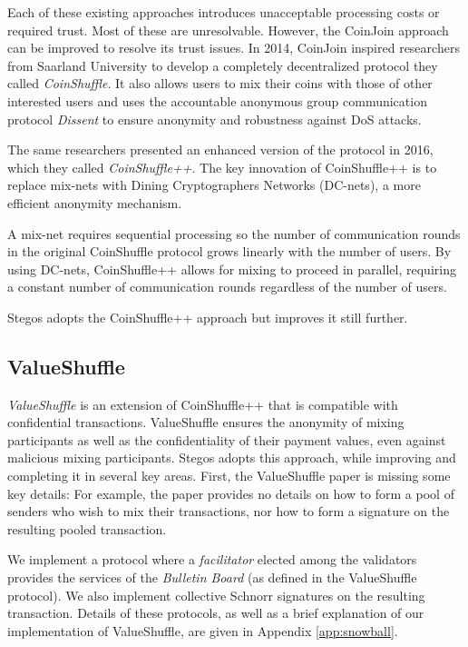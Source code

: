 \documentclass[8pt,fleqn,openany]{book}
\begin{document}
	Each of these existing approaches introduces unacceptable processing costs or required trust. Most of these are unresolvable. However, the CoinJoin approach can be improved to resolve its trust issues. In 2014, CoinJoin inspired researchers from Saarland University to develop a completely decentralized protocol they called \textit{CoinShuffle}\cite{c17}. It also allows users to mix their coins with those of other interested users and uses the accountable anonymous group communication protocol \textit{Dissent} to ensure anonymity and robustness against DoS attacks. 
	
	The same researchers presented an enhanced version of the protocol in 2016, which they called \textit{CoinShuffle++}\cite{c18}. The key innovation of CoinShuffle++ is to replace mix-nets with Dining Cryptographers Networks (DC-nets)\cite{c20}, a more efficient anonymity mechanism. 
	
	A mix-net requires sequential processing so the number of communication rounds in the original CoinShuffle protocol grows linearly with the number of users. By using DC-nets, CoinShuffle++ allows for mixing to proceed in parallel, requiring a constant number of communication rounds regardless of the number of users.
	
	Stegos adopts the CoinShuffle++ approach but improves it still further.
	
	\subsection{ValueShuffle}
	\textit{ValueShuffle}\cite{c19} is an extension of CoinShuffle++ that is compatible with confidential transactions. ValueShuffle ensures the anonymity of mixing participants as well as the confidentiality of their payment values, even against malicious mixing participants. Stegos adopts this approach, while improving and completing it in several key areas. First, the ValueShuffle paper is missing some key details: For example, the paper provides no details on how to form a pool of senders who wish to mix their transactions, nor how to form a signature on the resulting pooled transaction. 
	
	We implement a protocol where a \textit{facilitator} elected among the validators provides the services of the \textit{Bulletin Board} (as defined in the ValueShuffle protocol). We also implement collective Schnorr signatures\cite{c22} on the resulting transaction. Details of these protocols, as well as a brief explanation of our implementation of ValueShuffle, are given in Appendix \ref{app:snowball}.
	
\end{document}
